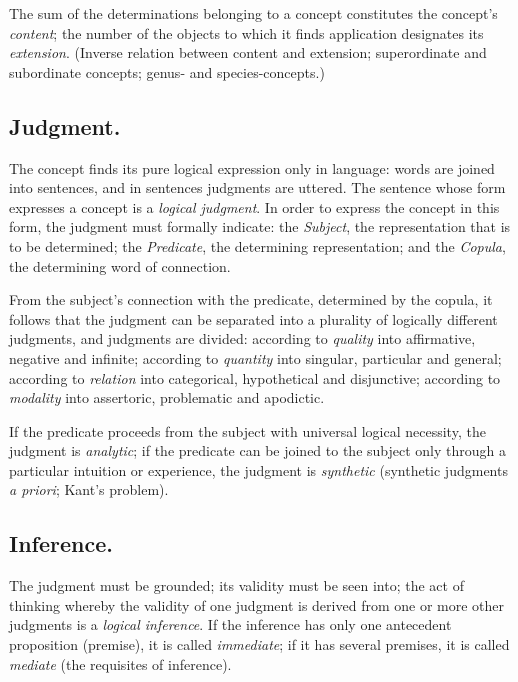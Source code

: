 \documentclass[12pt]{book}
\begin{document}
The sum of the determinations belonging to a concept constitutes the
concept's \emph{content}; the number of the objects to which it finds
application designates its \emph{extension}. (Inverse relation
between content and extension; superordinate and subordinate
concepts; genus- and species-concepts.)

\subsection*{Judgment.}

The concept finds its pure logical expression only in language: words
are joined into sentences, and in sentences judgments are uttered.
The sentence whose form expresses a concept is a \emph{logical
judgment}. In order to express the concept in this form, the judgment
must formally indicate: the \emph{Subject}, the representation that
is to be determined; the \emph{Predicate}, the determining
representation; and the \emph{Copula}, the determining word of
connection.

From the subject's connection with the predicate, determined by the
copula, it follows that the judgment can be separated into a
plurality of logically different judgments, and judgments are
divided: according to \emph{quality} into affirmative, negative and
infinite; according to \emph{quantity} into singular, particular and
general; according to \emph{relation} into categorical, hypothetical
and disjunctive; according to \emph{modality} into assertoric,
problematic and apodictic.

If the predicate proceeds from the subject with universal logical
necessity, the judgment is \emph{analytic}; if the predicate can be
joined to the subject only through a particular intuition or
experience, the judgment is \emph{synthetic} (synthetic judgments
\textit{a priori}; Kant's problem).

\subsection*{Inference.}

The judgment must be grounded; its validity must be seen into; the
act of thinking whereby the validity of one judgment is derived from
one or more other judgments is a \emph{logical inference}. If the
inference has only one antecedent proposition (premise), it is called
\emph{immediate}; if it has several premises, it is called
\emph{mediate} (the requisites of inference).
\end{document}
